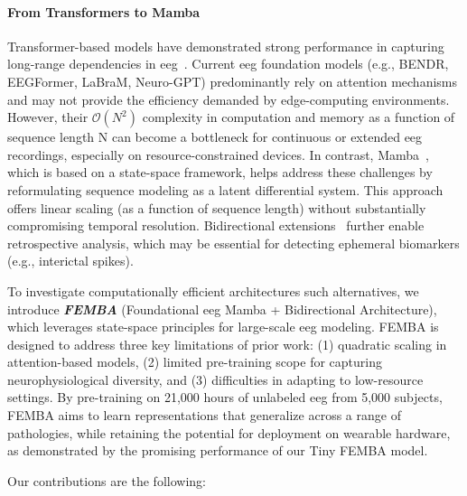 \paragraph*{From Transformers to Mamba}
Transformer-based models have demonstrated strong performance in capturing long-range dependencies in \gls{eeg}~\cite{chen2024eegformer,jianglarge}. Current \gls{eeg} foundation models (e.g., BENDR, EEGFormer, LaBraM, Neuro-GPT) predominantly rely on attention mechanisms and may not provide the efficiency demanded by edge-computing environments. However, their $\mathcal{O}(N^2)$ complexity in computation and memory as a function of sequence length N can become a bottleneck for continuous or extended \gls{eeg} recordings, especially on resource-constrained devices. In contrast, Mamba~\cite{gu2023mamba}, which is based on a state-space framework, helps address these challenges by reformulating sequence modeling as a latent differential system. This approach offers linear scaling (as a function of sequence length) without substantially compromising temporal resolution. Bidirectional extensions~\cite{liang_bi-mamba_2024} further enable retrospective analysis, which may be essential for detecting ephemeral biomarkers (e.g., interictal spikes).

To investigate computationally efficient architectures such alternatives, we introduce \emph{\textbf{FEMBA}} (Foundational \gls{eeg} Mamba + Bidirectional Architecture), which leverages state-space principles for large-scale \gls{eeg} modeling. FEMBA is designed to address three key limitations of prior work: (1) quadratic scaling in attention-based models, (2) limited pre-training scope for capturing neurophysiological diversity, and (3) difficulties in adapting to low-resource settings. By pre-training on 21,000 hours of unlabeled \gls{eeg} from 5,000 subjects, FEMBA aims to learn representations that generalize across a range of pathologies, while retaining the potential for deployment on wearable hardware, as demonstrated by the promising performance of our Tiny FEMBA model.


Our contributions are the following:


